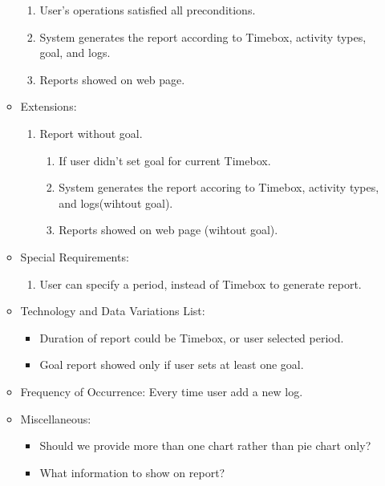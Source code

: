 \documentclass[12pt, a4paper]{article}
\begin{document}
\begin{CJK*}{UTF8}{bkai}
\begin{enumerate}
\begin{itemize}
\begin{enumerate}
              \item User's operations satisfied all preconditions.
              \item System generates the report according to Timebox, activity types, goal, and logs.
              \item Reports showed on web page.
            \end{enumerate}
          \item Extensions:
            \begin{enumerate}
              \item Report without goal.
                \begin{enumerate}
                  \item If user didn't set goal for current Timebox.
                  \item System generates the report accoring to Timebox, activity types, and logs(wihtout goal).
                  \item Reports showed on web page (wihtout goal).
                \end{enumerate}
            \end{enumerate}
          \item Special Requirements:
            \begin{enumerate}
              \item User can specify a period, instead of Timebox to generate report.
            \end{enumerate}
          \item Technology and Data Variations List:
            \begin{itemize}
              \item Duration of report could be Timebox, or user selected period.
              \item Goal report showed only if user sets at least one goal.
            \end{itemize}
          \item Frequency of Occurrence: Every time user add a new log.
          \item Miscellaneous:
            \begin{itemize}
              \item Should we provide more than one chart rather than pie chart only?
              \item What information to show on report?
            \end{itemize}
        \end{itemize}

\end{enumerate}
\end{CJK*}
\end{document}
